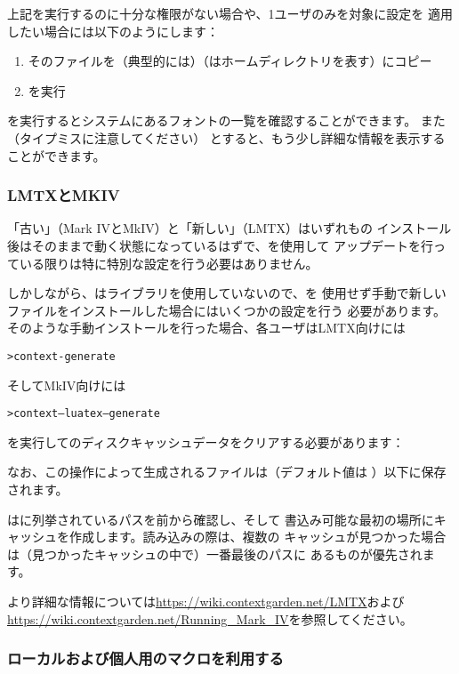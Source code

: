 \documentclass[uplatex,dvipdfmx]{jsarticle}
\begin{document}
上記を実行するのに十分な権限がない場合や、1ユーザのみを対象に設定を
適用したい場合には以下のようにします：
%
\begin{enumerate}
\item そのファイルを（典型的には）（\dir{~}はホームディレクトリを表す）にコピー
\item {}を実行
\end{enumerate}

を実行するとシステムにあるフォントの一覧を確認することができます。
また（タイプミスに注意してください）
とすると、もう少し詳細な情報を表示することができます。

\subsubsection{{\ConTeXt} LMTXとMKIV}
\label{sec:context-mkiv}

「古い」\ConTeXt （Mark IVとMkIV）と「新しい」\ConTeXt （LMTX）はいずれも\TL の
インストール後はそのままで動く状態になっているはずで、を使用して
アップデートを行っている限りは特に特別な設定を行う必要はありません。

しかしながら、\ConTeXt は\KPS ライブラリを使用していないので、を
使用せず手動で新しいファイルをインストールした場合にはいくつかの設定を行う
必要があります。そのような手動インストールを行った場合、各ユーザはLMTX向けには
%
\begin{alltt}
> context -generate
\end{alltt}
%
そしてMkIV向けには
%
\begin{alltt}
> context --luatex --generate
\end{alltt}
%
を実行して\ConTeXt のディスクキャッシュデータをクリアする必要があります：

なお、この操作によって生成されるファイルは（デフォルト値は
）以下に保存されます。

\ConTeXt はに列挙されているパスを前から確認し、そして
書込み可能な最初の場所にキャッシュを作成します。読み込みの際は、複数の
キャッシュが見つかった場合は（見つかったキャッシュの中で）一番最後のパスに
あるものが優先されます。

より詳細な情報については\url{https://wiki.contextgarden.net/LMTX}および
\url{https://wiki.contextgarden.net/Running_Mark_IV}を参照してください。

\subsubsection{ローカルおよび個人用のマクロを利用する}
\label{sec:local-personal-macros}
\end{document}

